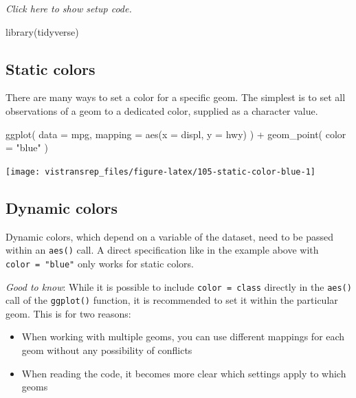 \documentclass[]{book}
\newenvironment{Shaded}{}{}
\newcommand{\DataTypeTok}[1]{#1}
\newcommand{\KeywordTok}[1]{\textcolor[rgb]{0.00,0.00,1.00}{#1}}
\newcommand{\NormalTok}[1]{#1}
\newcommand{\OperatorTok}[1]{#1}
\newcommand{\StringTok}[1]{\textcolor[rgb]{0.00,0.50,0.50}{#1}}
\providecommand{\tightlist}{%
  \setlength{\itemsep}{0pt}\setlength{\parskip}{0pt}}
\begin{document}
\emph{Click here to show setup code.}

\begin{Shaded}
\begin{Highlighting}[]
\KeywordTok{library}\NormalTok{(tidyverse)}
\end{Highlighting}
\end{Shaded}

\hypertarget{static-colors}{%
\subsection{Static colors}\label{static-colors}}

There are many ways to set a color for a specific geom.
The simplest is to set all observations of a geom to a dedicated color, supplied as a character value.

\begin{Shaded}
\begin{Highlighting}[]
\KeywordTok{ggplot}\NormalTok{(}
  \DataTypeTok{data =}\NormalTok{ mpg,}
  \DataTypeTok{mapping =} \KeywordTok{aes}\NormalTok{(}\DataTypeTok{x =}\NormalTok{ displ, }\DataTypeTok{y =}\NormalTok{ hwy)}
\NormalTok{) }\OperatorTok{+}
\StringTok{  }\KeywordTok{geom_point}\NormalTok{(}
    \DataTypeTok{color =} \StringTok{"blue"}
\NormalTok{  )}
\end{Highlighting}
\end{Shaded}

\begin{flushright}\texttt{[image: vistransrep\_files/figure-latex/105-static-color-blue-1]} \end{flushright}

\hypertarget{dynamic-colors}{%
\subsection{Dynamic colors}\label{dynamic-colors}}

Dynamic colors, which depend on a variable of the dataset, need to be passed within an \texttt{aes()} call.
A direct specification like in the example above with \texttt{color\ =\ "blue"} only works for static colors.

\emph{Good to know}: While it is possible to include \texttt{color\ =\ class} directly in the \texttt{aes()} call of the \texttt{ggplot()} function, it is recommended to set it within the particular geom.
This is for two reasons:

\begin{itemize}
\tightlist
\item
  When working with multiple geoms, you can use different mappings for each geom without any possibility of conflicts
\item
  When reading the code, it becomes more clear which settings apply to which geoms
\end{itemize}
\end{document}
